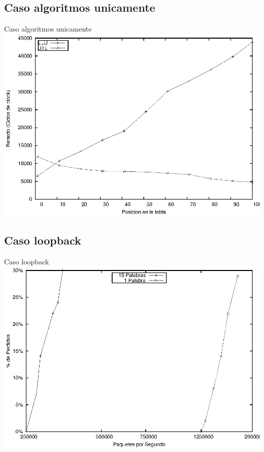 \documentclass[xcolor=dvipsnames]{beamer}
\begin{document}
\subsection{Caso algoritmos unicamente}
\begin{frame}{Caso algoritmos unicamente} 
\center	
\includegraphics[scale=0.70]{figures/llu-utlsof.eps} 
\end{frame}

\subsection{Caso loopback}
\begin{frame}{Caso loopback} 
\center	
\includegraphics[scale=0.70]{figures/loop.eps} 
\end{frame}
\end{document}
